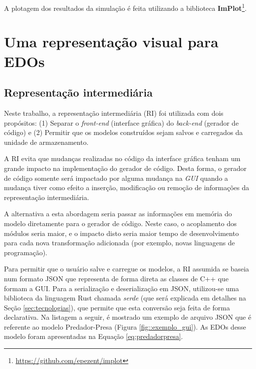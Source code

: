 \documentclass[
	12pt,				%
	openright,			%
	oneside,			%
	a4paper,			%
	main=brazil,
	english,			%
	]{ufsj-abntex2}
\begin{document}

% 

A plotagem dos resultados da simulação é feita utilizando a biblioteca \textbf{ImPlot}\footnote{\href{https://github.com/epezent/implot}{https://github.com/epezent/implot}}.

\section{Uma representação visual para EDOs}
\label{sec:representacao-visual-edo}

\subsection{Representação intermediária}\label{subsection:RI}

Neste trabalho, a representação intermediária (RI) foi utilizada com dois propósitos: (1) Separar o \textit{front-end} (interface gráfica) do \textit{back-end} (gerador de código) e (2) Permitir que os modelos construídos sejam salvos e carregados da unidade de armazenamento.

A RI evita que mudanças realizadas no código da interface gráfica tenham um grande impacto na implementação do gerador de código. Desta forma, o gerador de código somente será impactado por alguma mudança na \textit{GUI} quando a mudança tiver como efeito a inserção, modificação ou remoção de informações da representação intermediária.

A alternativa a esta abordagem seria passar as informações em memória do modelo diretamente para o gerador de código. Neste caso, o acoplamento dos módulos seria maior, e o impacto disto seria maior tempo de desenvolvimento para cada nova transformação adicionada (por exemplo, novas linguagens de programação).

Para permitir que o usuário salve e carregue os modelos, a RI assumida se baseia num formato JSON que representa de forma direta as classes de C++ que formam a GUI. Para a serialização e deserialização em JSON, utilizou-se uma biblioteca da linguagem Rust chamada \textit{serde} (que será explicada em detalhes na Seção \ref{sec:tecnologias}), que permite que esta conversão seja feita de forma declarativa. Na listagem a seguir, é mostrado um exemplo de arquivo JSON que é referente ao modelo Predador-Presa (Figura \ref{fig::exemplo_gui}). As EDOs desse modelo foram apresentadas na Equação \ref{eq:predadorpresa}. 
\end{document}
